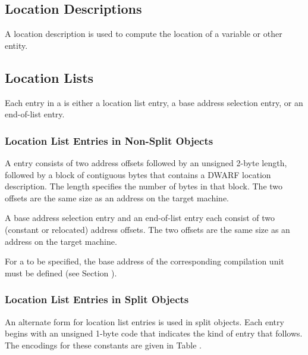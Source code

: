 \subsection{Location Descriptions}
\label{datarep:locationdescriptions}

A location description is used to compute the 
location of a variable or other entity.

\subsection{Location Lists}
\label{datarep:locationlists}

Each entry in a  is either a location list entry,
a base address selection entry, or an 
end-of-list entry.

\subsubsection{Location List Entries in Non-Split Objects}
A  entry consists of two address offsets followed
by an unsigned 2-byte length, followed by a block of contiguous bytes
that contains a DWARF location description. The length
specifies the number of bytes in that block. The two offsets
are the same size as an address on the target machine.

A base address selection entry and an 
end-of-list entry each
consist of two (constant or relocated) address offsets. The two
offsets are the same size as an address on the target machine.

For a  to be specified, the base address of
the corresponding compilation unit must be defined 
(see Section ).

\subsubsection{Location List Entries in Split Objects}
\label{datarep:locationlistentriesinsplitobjects}
An alternate form for location list entries is used in split objects. 
Each entry begins with an unsigned 1-byte code that indicates the kind of entry
that follows. The encodings for these constants are given in
Table .

